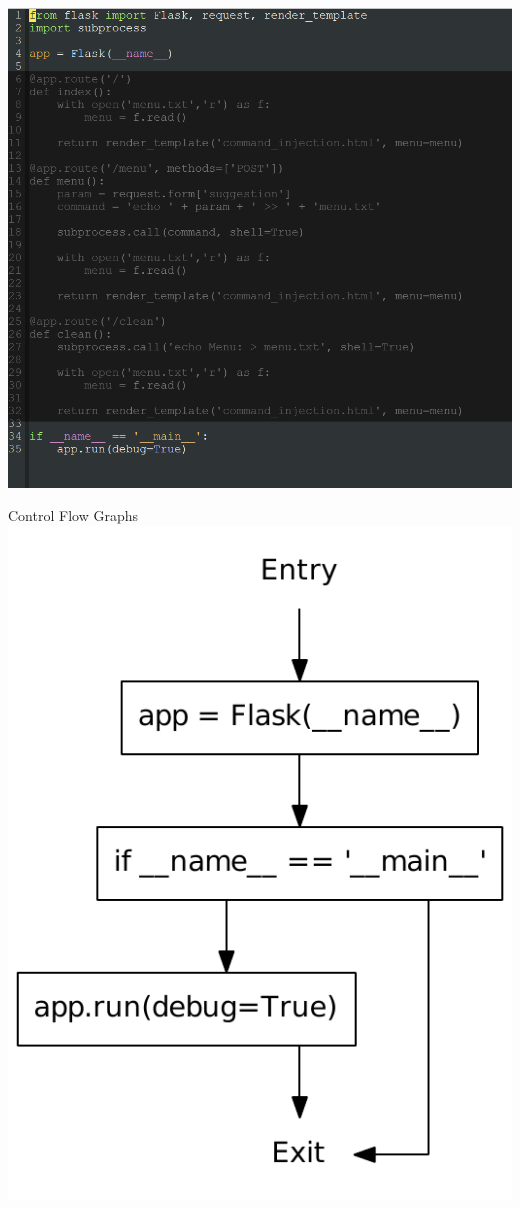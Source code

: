 \begin{frame}
  \includegraphics[height=0.8\textheight]{graphics/adaptor_module}
\end{frame}


\begin{frame}{Control Flow Graphs}
    \center
    \includegraphics[height=0.8\textheight]{graphics/CFG_module}
\end{frame}

